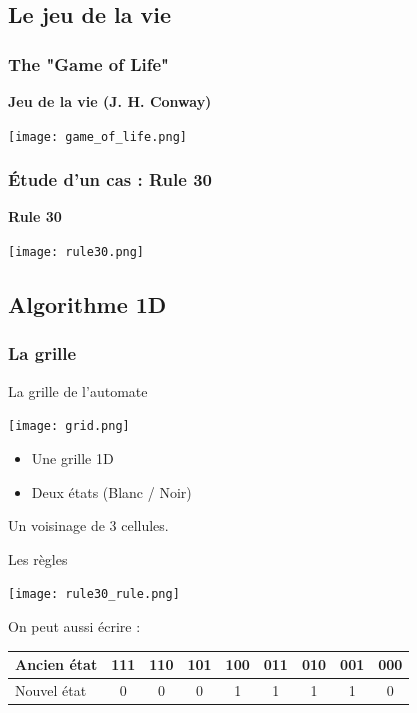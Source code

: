 \documentclass{beamer}
\begin{document}
\subsection{Le jeu de la vie}
\begin{frame}
\frametitle{The "Game of Life"}
\begin{center}
\bf{Jeu de la vie} (J. H. Conway)
\end{center}
\begin{center}
\texttt{[image: game\_of\_life.png]}
\end{center}
\end{frame}

\begin{frame}
\frametitle{Étude d'un cas : Rule 30}
\begin{center}
\textbf{Rule 30}
\end{center}
\begin{center}
\texttt{[image: rule30.png]}
\end{center}
\end{frame}

\subsection{Algorithme 1D}
\begin{frame}
\frametitle{La grille}
\begin{block}{La grille de l'automate}
\begin{center}
\texttt{[image: grid.png]}
\end{center}
\end{block}
\begin{itemize}
	\item Une grille 1D
	\item Deux états (Blanc / Noir)
\end{itemize}
\end{frame}

\begin{frame}
\begin{block}{}
	Un voisinage de 3 cellules.
\end{block}
\pause
\begin{block}{Les règles}
	\begin{center}
	\texttt{[image: rule30\_rule.png]}
	\end{center}
\end{block}
\pause
\begin{block}{On peut aussi écrire :}
	\begin{center}
	\begin{tabular}{|l|c|c|c|c|c|c|c|c|}
	\hline
	Ancien état & 111 & 110 & 101 & 100 & 011 & 010 & 001 & 000 \\
	\hline
	Nouvel état	& 0   & 0   & 0   & 1   & 1   & 1   & 1   & 0 \\
	\hline
	\end{tabular}
	\end{center}
\end{block}
\end{frame}
\end{document}
